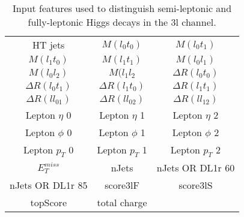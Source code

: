 \begin{table}[H]
  \begin{center}
  \begin{tabular}{ccc}
    \hline\hline
    HT jets & $M(l_0t_0)$ & $M(l_0t_1)$ \\
    $M(l_1t_0)$ & $M(l_1t_1)$ & $M(l_0l_1)$ \\
    $M(l_0l_2)$ & $M(l_1l_2$ & $\Delta R(l_0t_0)$ \\
    $\Delta R(l_0t_1)$ & $\Delta R(l_1t_0)$ & $\Delta R(l_1t_1)$ \\
    $\Delta R(ll_01)$ & $\Delta R(ll_02)$ & $\Delta R(ll_12)$ \\
    Lepton  $\eta$ 0 & Lepton  $\eta$ 1 & Lepton  $\eta$ 2 \\
    Lepton $\phi$ 0 & Lepton $\phi$ 1 & Lepton $\phi$ 2 \\
    Lepton  $p_T$ 0 & Lepton  $p_T$ 1 & Lepton  $p_T$ 2 \\
    $E_T^{miss}$ & nJets & nJets OR DL1r 60 \\
    nJets OR DL1r 85 & score3lF & score3lS \\
    topScore & total charge \\
    \hline
  \end{tabular}
  \end{center}
  \caption{Input features used to distinguish semi-leptonic and fully-leptonic Higgs decays in the 3l channel.}
  \label{tab:decay3lfeatures}
\end{table}
